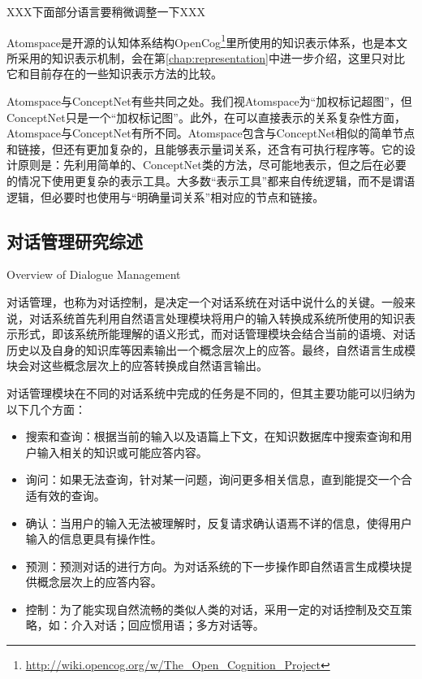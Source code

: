 XXX下面部分语言要稍微调整一下XXX


Atomspace是开源的认知体系结构OpenCog\footnote{\url{http://wiki.opencog.org/w/The_Open_Cognition_Project}}里所使用的知识表示体系，也是本文所采用的知识表示机制，会在第\ref{chap:representation}中进一步介绍，这里只对比它和目前存在的一些知识表示方法的比较。

Atomspace与ConceptNet有些共同之处。我们视Atomspace为“加权标记超图”，但ConceptNet只是一个“加权标记图”。此外，在可以直接表示的关系复杂性方面，Atomspace与ConceptNet有所不同。Atomspace包含与ConceptNet相似的简单节点和链接，但还有更加复杂的，且能够表示量词关系，还含有可执行程序等。它的设计原则是：先利用简单的、ConceptNet类的方法，尽可能地表示，但之后在必要的情况下使用更复杂的表示工具。大多数“表示工具”都来自传统逻辑，而不是谓语逻辑，但必要时也使用与“明确量词关系”相对应的节点和链接。



\subsection{对话管理研究综述}{Overview of Dialogue Management}

对话管理，也称为对话控制，是决定一个对话系统在对话中说什么的关键。一般来说，对话系统首先利用自然语言处理模块将用户的输入转换成系统所使用的知识表示形式，即该系统所能理解的语义形式，而对话管理模块会结合当前的语境、对话历史以及自身的知识库等因素输出一个概念层次上的应答。最终，自然语言生成模块会对这些概念层次上的应答转换成自然语言输出。

对话管理模块在不同的对话系统中完成的任务是不同的，但其主要功能可以归纳为以下几个方面：

\begin{itemize}

\item 搜索和查询：根据当前的输入以及语篇上下文，在知识数据库中搜索查询和用户输入相关的知识或可能应答内容。
\item 询问：如果无法查询，针对某一问题，询问更多相关信息，直到能提交一个合适有效的查询。
\item 确认：当用户的输入无法被理解时，反复请求确认语焉不详的信息，使得用户输入的信息更具有操作性。
\item 预测：预测对话的进行方向。为对话系统的下一步操作即自然语言生成模块提供概念层次上的应答内容。
\item 控制：为了能实现自然流畅的类似人类的对话，采用一定的对话控制及交互策略，如：介入对话；回应惯用语；多方对话等。
\end{itemize}

